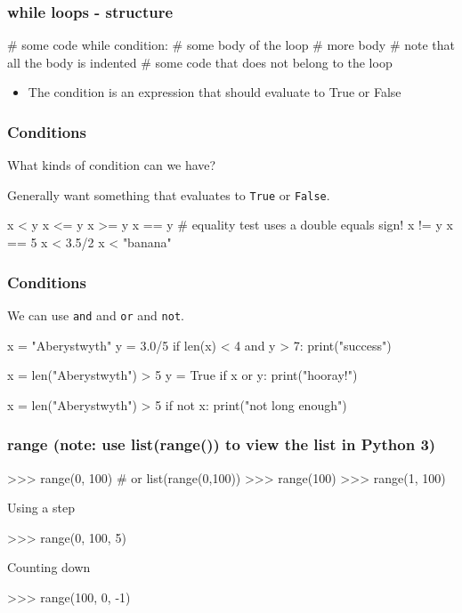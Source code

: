 \documentclass{beamer}
\begin{document}
\begin{frame}[fragile]
\frametitle{while loops - structure}
\begin{code}
# some code
while condition:
   # some body of the loop
   # more body
   # note that all the body is indented
# some code that does not belong to the loop
\end{code}
\begin{itemize}
\item The condition is an expression that should evaluate to True or False
\end{itemize}
\end{frame}

\begin{frame}[fragile]
\frametitle{Conditions}
What kinds of condition can we have?

Generally want something that evaluates to {\tt True} or {\tt False}.

\begin{code}
x < y
x <= y
x >= y
x == y    # equality test uses a double equals sign!
x != y
x == 5
x < 3.5/2
x < "banana"
\end{code}
\end{frame}



\begin{frame}[fragile]
\frametitle{Conditions}
We can use {\tt and} and {\tt or} and {\tt not}.

\begin{code}
x = "Aberystwyth"
y = 3.0/5
if len(x) < 4 and y > 7:
   print("success")

x = len("Aberystwyth") > 5
y = True
if x or y:
   print("hooray!")

x = len("Aberystwyth") > 5
if not x:
   print("not long enough")
\end{code}
\end{frame}


\begin{frame}[fragile]
\frametitle{range (note: use list(range()) to view the list in Python 3)}
\begin{code}
>>> range(0, 100)  # or list(range(0,100))
>>> range(100)
>>> range(1, 100)
\end{code}
Using a step
\begin{code}
>>> range(0, 100, 5)
\end{code}
Counting down
\begin{code}
>>> range(100, 0, -1)
\end{code}
\end{frame}
\end{document}
